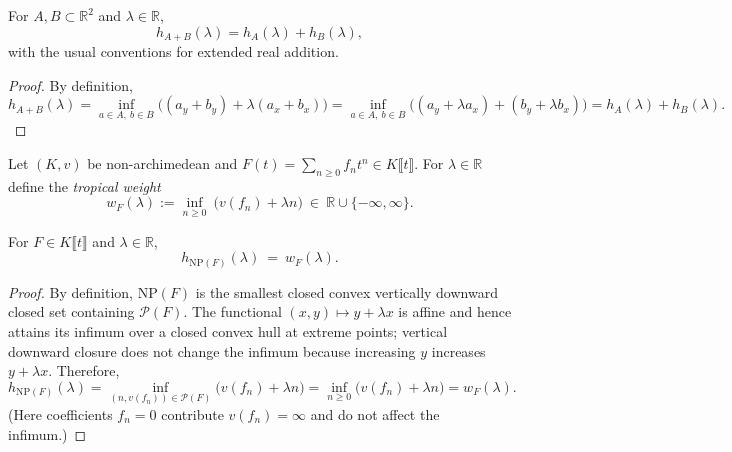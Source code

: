 \begin{lemma}
  \label{lem:support_minkowski}
  \leanok
  For $A,B\subset\mathbb{R}^2$ and $\lambda\in\mathbb{R}$,
  \[
    h_{A+B}(\lambda)=h_A(\lambda)+h_B(\lambda),
  \]
  with the usual conventions for extended real addition.
\end{lemma}

\begin{proof}
  \leanok
  By definition,
  \[
    h_{A+B}(\lambda)=\inf_{a\in A,\ b\in B}\big((a_y+b_y)+\lambda(a_x+b_x)\big)
    =\inf_{a\in A,\ b\in B}\big((a_y+\lambda a_x)+(b_y+\lambda b_x)\big)
    =h_A(\lambda)+h_B(\lambda).
  \]
\end{proof}

\begin{definition}
  \label{def:tropical_weight}
  \leanok
  Let $(K,v)$ be non-archimedean and $F(t)=\sum_{n\ge 0} f_n t^n\in K\llbracket t\rrbracket$.
  For $\lambda\in\mathbb{R}$ define the \emph{tropical weight}
  \[
    w_F(\lambda) := \inf_{n\ge 0}\ \big(v(f_n)+\lambda n\big)\ \in\ \mathbb{R}\cup\{-\infty,\infty\}.
  \]
\end{definition}

\begin{lemma}
  \label{lem:support_newton_polygon}
  \leanok
  For $F\in K\llbracket t\rrbracket$ and $\lambda\in\mathbb{R}$,
  \[
    h_{\mathrm{NP}(F)}(\lambda)\ =\ w_F(\lambda).
  \]
\end{lemma}

\begin{proof}
  \leanok
  By definition, $\mathrm{NP}(F)$ is the smallest closed convex vertically downward closed set containing $\mathcal{P}(F)$.
  The functional $(x,y)\mapsto y+\lambda x$ is affine and hence attains its infimum over a closed convex hull
  at extreme points; vertical downward closure does not change the infimum because increasing $y$ increases $y+\lambda x$.
  Therefore,
  \[
    h_{\mathrm{NP}(F)}(\lambda)=\inf_{(n,v(f_n))\in\mathcal{P}(F)}\big(v(f_n)+\lambda n\big)
    =\inf_{n\ge 0}\big(v(f_n)+\lambda n\big)=w_F(\lambda).
  \]
  (Here coefficients $f_n=0$ contribute $v(f_n)=\infty$ and do not affect the infimum.)
\end{proof}

